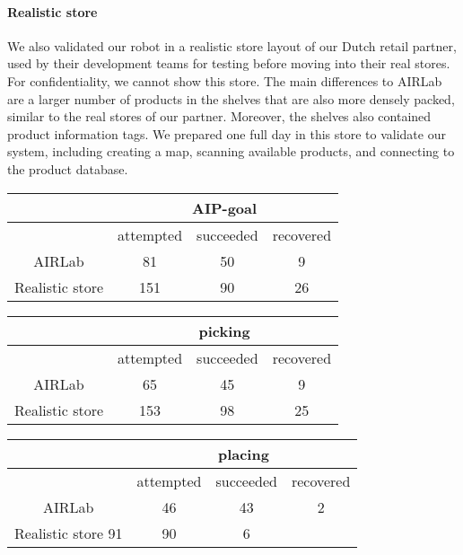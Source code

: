 \paragraph{Realistic store}
We also validated our robot in a realistic store layout of our Dutch retail partner, used by their development teams for testing before moving into their real stores.  
For confidentiality, we cannot show this store.
The main differences to AIRLab are a larger number of products in the shelves that are also more densely packed, similar to the real stores of our partner.
Moreover, the shelves also contained product information tags. 
We prepared one full day in this store to validate our system, including creating a map, scanning available products, and connecting to the product database.
\begin{table*}[t]
    \centering
    \caption{Number of attempted, succeeded and recovered
    symbolic action attempts for picking and placing
    (the more complex symbolic actions). Note, that a recovery is
    defined as a successful execution of a symbolic action after a
    failure.
    }
    \label{tab:recoveries}
    \begin{tabular}{c|ccc}
        \toprule
         & \multicolumn{3}{c}{AIP-goal} \\
        \midrule
        & attempted & succeeded & recovered \\
        AIRLab & 81 & 50 & 9 \\
        Realistic store & 151 &  90 & 26 \\
        \bottomrule
    \end{tabular}   
    \begin{tabular}{c|ccc}
        \toprule
        & \multicolumn{3}{c}{picking} \\
        \midrule
        & attempted & succeeded & recovered \\
        AIRLab &  65 & 45 & 9 \\
        Realistic store & 153 & 98 & 25 \\
        \bottomrule
    \end{tabular}   
    \begin{tabular}{c|ccc}
        \toprule
        & \multicolumn{3}{c}{placing} \\
        \midrule
        & attempted & succeeded & recovered \\
        AIRLab &  46 & 43 & 2 \\
        Realistic store 91 & 90 & 6 \\
        \bottomrule
    \end{tabular}   
\end{table*}
%
